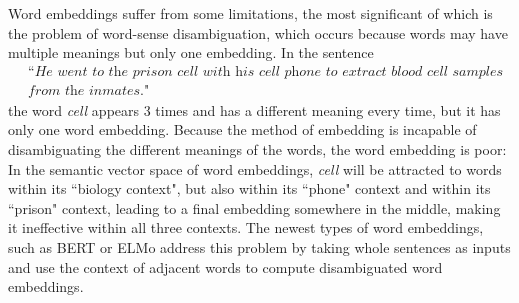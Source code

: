         Word \glspl{embedding} suffer from some limitations, the most significant of which is the problem of word-sense disambiguation, which occurs because words may have multiple meanings but only one \gls{embedding}. In the sentence
        \begin{align*}
            &\textit{``He went to the prison cell with his cell phone to extract blood cell samples}\\
            & \textit{from the inmates."}
        \end{align*}
        the word \textit{cell} appears 3 times and has a different meaning every time, but it has only one word \gls{embedding}. Because the method of \gls{embedding} is incapable of disambiguating the different meanings of the words, the word \gls{embedding} is poor: In the semantic vector space of word \glspl{embedding}, \textit{cell} will be attracted to words within its ``biology context", but also within its ``phone" context and within its ``prison" context, leading to a final \gls{embedding} somewhere in the middle, making it ineffective within all three contexts. The newest types of word \glspl{embedding}, such as BERT\cite{devlin2018bert} or ELMo\cite{peters2018elmo} address this problem by taking whole sentences as inputs and use the context of adjacent words to compute disambiguated word \glspl{embedding}.